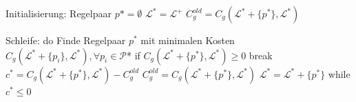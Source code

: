 \begin{algorithm}[caption={Generalisieren eines L-Systems mit Gewichtung $w_0$}, label={alg7}]
Initialisierung:
Regelpaar $p* = \emptyset$
$\mathcal{L}^* = \mathcal{L}^+$
$C_g^{old} = C_g(\mathcal{L}^* + \{p^*\}, \mathcal{L}^*)$

Schleife:
do
Finde Regelpaar $p^*$ mit minimalen Kosten $C_g(\mathcal{L}^* + \{p_i\}, \mathcal{L}^*), \forall p_i \in
\mathcal{P}$*
if $C_g(\mathcal{L}^* + \{p^*\}, \mathcal{L}^*) \geq 0$
break
$c^* = C_g(\mathcal{L}^* + \{p^*\}, \mathcal{L}^*) - C_g^{old}$
$C_g^{old} = C_g(\mathcal{L}^* + \{p^*\}, \mathcal{L}^*)$
$\mathcal{L}^* = \mathcal{L}^* + \{p^*\}$
while $c^* \leq 0$
\end{algorithm}
